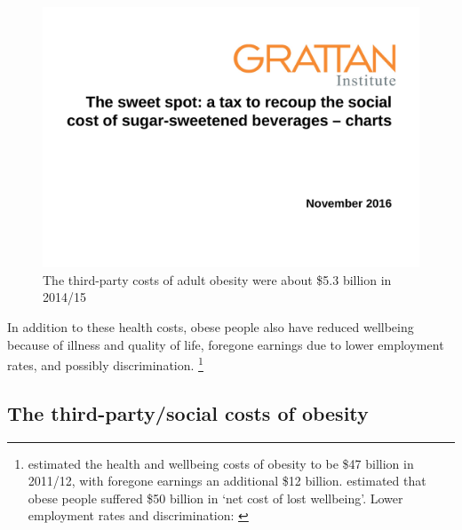 \documentclass[embargoed]{grattan}
\begin{document}
\begin{figure}
\caption{The third-party costs of adult obesity were about \$5.3 billion in 2014/15}

\includegraphics[page=4]{atlas/ObesityCharts}


\end{figure}

In addition to these health costs, obese people also have reduced wellbeing because of illness and quality of life, foregone earnings due to lower employment rates, and possibly discrimination.%
\footnote{\textcite{PwC2015Weighingcostobesity} estimated the health and wellbeing costs of obesity to be \$47 billion in 2011/12, with foregone earnings an additional \$12 billion. \textcite{Economics2008growingcostobesity} estimated that obese people suffered \$50 billion in `net cost of lost wellbeing'.
Lower employment rates and discrimination: \textcites{Rooth2009Obesityattractivenessdifferential}{Boeckerman2016EffectWeightLabor}{Reichert2015Obesityweightloss}{Cawley2015economyscalesselective}}

\subsection{The third-party/social costs of obesity}\label{the-third-partysocial-costs-of-obesity}
\end{document}
